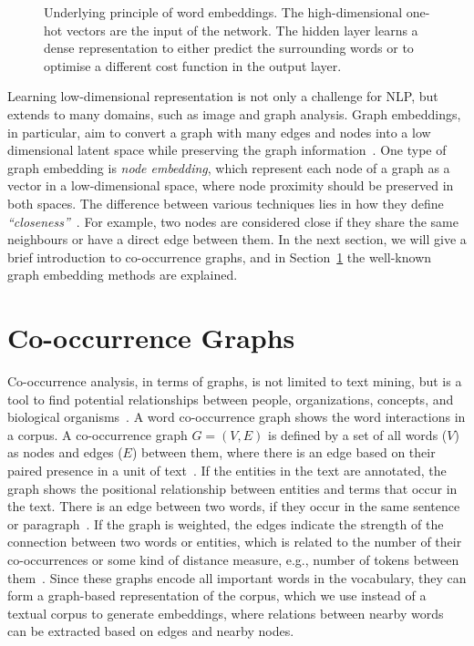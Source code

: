 \begin{figure}
\centering 
\resizebox{0.8\textwidth}{0.48\textwidth}{      

}
\caption{Underlying principle of word embeddings. The high-dimensional one-hot vectors are the input of the network. The hidden layer learns a dense representation to either predict the surrounding words or to optimise a different cost function in the output layer.}
\label{fig:emb}
\end{figure}
\noindent
Learning low-dimensional representation is not only a challenge for NLP, but extends to many domains, such as image and graph analysis. Graph embeddings, in particular,  aim to convert a graph with many edges and nodes into a low dimensional latent space while preserving the graph information~. One type of graph embedding is \emph{node embedding}, which represent each node of a graph as a vector in a low-dimensional space, where node proximity should be preserved in both spaces.
The difference between various techniques lies in how they define \emph{``closeness''}~. For example, two nodes are considered close if they share the same neighbours or have a direct edge between them. In the next section, we will give a brief introduction to co-occurrence graphs, and in Section~\ref{sec:graph} the well-known graph embedding methods are explained.  

\section{Co-occurrence Graphs}
\label{sec:graph}
Co-occurrence analysis, in terms of graphs, is not limited to text mining, but is a tool to find potential relationships between people, organizations, concepts, and biological organisms~. A word co-occurrence graph shows the word interactions in a corpus. A co-occurrence graph $G=(V,E)$ is defined by a set of all words ($V$) as nodes and edges ($E$) between them, where there is an edge based on their paired presence in a unit of text~. If the entities in the text are annotated, the graph shows the positional relationship between entities and terms that occur in the text. There is an edge between two words, if they occur in the same sentence or paragraph~. If the graph is weighted, the edges indicate the strength of the connection between two words or entities, which is related to the number of their co-occurrences or some kind of distance measure, e.g., number of tokens between them~. Since these graphs encode all important words in the vocabulary, they can form a graph-based representation of the corpus, which we use instead of a textual corpus to generate embeddings, where relations between nearby words can be extracted based on edges and nearby nodes.\\

